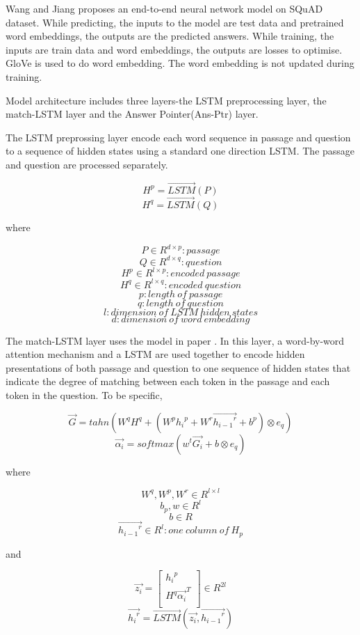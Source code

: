 \documentclass[12pt]{article}
\begin{document}
Wang and Jiang \cite{wang2016machine} proposes an end-to-end neural network model on SQuAD dataset. While predicting, the inputs to the model are test data and pretrained word embeddings, the outputs are the predicted answers. While training, the inputs are train data and word embeddings, the outputs are losses to optimise. GloVe is used to do word embedding. The word embedding is not updated during training.

Model architecture includes three layers-the LSTM preprocessing layer, the match-LSTM layer and the Answer Pointer(Ans-Ptr) layer.

The LSTM preprossing layer encode each word sequence in passage and question to a sequence of hidden states using a standard one direction LSTM. The passage and question are processed separately.

$$H^p = \overrightarrow{LSTM}(P)$$
$$H^q = \overrightarrow{LSTM}(Q)$$

where

 $$P\in R^{d \times p}: passage$$
 $$Q\in R^{d \times q}: question$$
 $$H^p\in R^{l \times p}: encoded\ passage$$
 $$H^q\in R^{l \times q}: encoded\ question$$
 $$p: length \ of\ passage$$
 $$q: length\ of\ question$$
 $$l: dimension\ of\ LSTM\ hidden\ states$$
 $$d: dimension\ of\ word\ embedding$$

The match-LSTM layer uses the model in paper \cite{wang2015learning}. In this layer, a word-by-word attention mechanism and a LSTM are used together to encode hidden presentations of both passage and question to one sequence of hidden states that indicate the degree of matching between each token in the passage and each token in the question. To be specific,

$$\overrightarrow{G} = tahn(W^qH^q + (W^p{h_i}^p + W^r\overrightarrow{{h_{i-1}}^r} + b^p) \otimes e_q)$$
$$\overrightarrow{\alpha _i} = softmax(w^t\overrightarrow{G_i} + b \otimes e_q)$$


where

$$W^q, W^p, W^r\in R^{l \times l} $$
$$b_p, w\in R^{l}  $$
$$b \in R $$
$$\overrightarrow{{h_{i-1}}^r}\in R^{l}: one\ column\ of\ H_p  $$

and

\[ \overrightarrow{z_i} =
\begin{bmatrix}
{h_i}^p \\
H^q\overrightarrow{ {\alpha _i}}^T \\
\end{bmatrix}
\in R^{2l}
\]
$$\overrightarrow{{h_i}^r} = \overrightarrow{LSTM}(\overrightarrow{z_i}, \overrightarrow{{h_{i-1}}^r})$$
\end{document}

